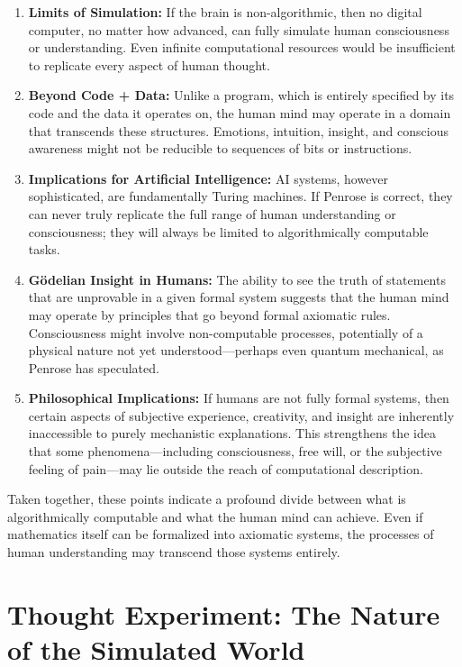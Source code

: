 \begin{enumerate}
\item \textbf{Limits of Simulation:} If the brain is non-algorithmic, then no digital computer, no matter how advanced, can fully simulate human consciousness or understanding.
  Even infinite computational resources would be insufficient to replicate every aspect of human thought.
    
\item \textbf{Beyond Code + Data:} Unlike a program, which is entirely specified by its code and the data it operates on, the human mind may operate in a domain that transcends these structures.
  Emotions, intuition, insight, and conscious awareness might not be reducible to sequences of bits or instructions.
    
\item \textbf{Implications for Artificial Intelligence:} AI systems, however sophisticated, are fundamentally Turing machines.
  If Penrose is correct, they can never truly replicate the full range of human understanding or consciousness; they will always be limited to algorithmically computable tasks.
    
\item \textbf{G\"odelian Insight in Humans:} The ability to see the truth of statements that are unprovable in a given formal system suggests that the human mind may operate by principles that go beyond formal axiomatic rules.
  Consciousness might involve non-computable processes, potentially of a physical nature not yet understood---perhaps even quantum mechanical, as Penrose has speculated.
    
    \item \textbf{Philosophical Implications:} If humans are not fully formal systems, then certain aspects of subjective experience, creativity, and insight are inherently inaccessible to purely mechanistic explanations. This strengthens the idea that some phenomena---including consciousness, free will, or the subjective feeling of pain---may lie outside the reach of computational description.
\end{enumerate}

Taken together, these points indicate a profound divide between what is algorithmically computable and what the human mind can achieve.
Even if mathematics itself can be formalized into axiomatic systems, the processes of human understanding may transcend those systems entirely. 


\section{Thought Experiment: The Nature of the Simulated World}

